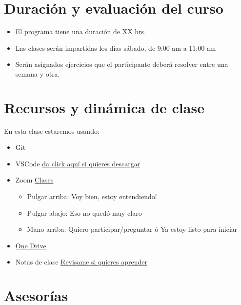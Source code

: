 \documentclass[
]{book}
\providecommand{\tightlist}{%
  \setlength{\itemsep}{0pt}\setlength{\parskip}{0pt}}
\begin{document}
\section*{Duración y evaluación del curso}\label{duraciuxf3n-y-evaluaciuxf3n-del-curso}

\begin{itemize}
\item
  El programa tiene una duración de XX hrs.
\item
  Las clases serán impartidas los días sábado, de 9:00 am a 11:00 am
\item
  Serán asignados ejercicios que el participante deberá resolver entre una semana y otra.
\end{itemize}

\section*{Recursos y dinámica de clase}\label{recursos-y-dinuxe1mica-de-clase}

En esta clase estaremos usando:

\begin{itemize}
\tightlist
\item
  Git
\item
  VSCode \href{https://code.visualstudio.com/download}{da click aquí si quieres descargar}
\item
  Zoom \href{https://us02web.zoom.us/j/5155440751?pwd=YzJCOGF0VnlZdlZlS0Fpc3MvZEhadz09}{Clases}

  \begin{itemize}
  \tightlist
  \item
    Pulgar arriba: Voy bien, estoy entendiendo!
  \item
    Pulgar abajo: Eso no quedó muy claro
  \item
    Mano arriba: Quiero participar/preguntar ó Ya estoy listo para iniciar
  \end{itemize}
\item
  \href{https://1drv.ms/f/s!AuOiA083gYHmhLdIesliXOiFEVnC7Q?e=NMcoy2}{One Drive}
\item
  Notas de clase \href{}{Revisame si quieres aprender}
\end{itemize}

\section*{Asesorías}\label{asesoruxedas}
\end{document}
